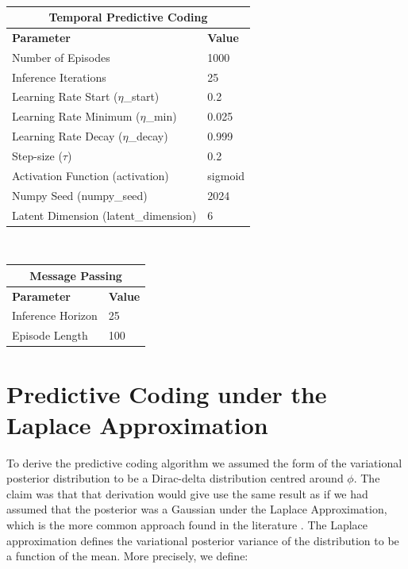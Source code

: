 \documentclass{article}
\begin{document}
\

\begin{table}[h!]
    \centering
    \label{tab:config_table}
    \begin{tabular}{ |p{5cm}||p{5cm}| }
        \hline
        \multicolumn{2}{|c|}{Temporal Predictive Coding} \\
        \hline
        \textbf{Parameter} & \textbf{Value} \\
        \hline
        Number of Episodes & 1000 \\
        Inference Iterations& 25 \\
        Learning Rate Start ($\eta$\_start)  & 0.2 \\
        Learning Rate Minimum ($\eta$\_min)  & 0.025 \\
        Learning Rate Decay ($\eta$\_decay)  & 0.999 \\
        Step-size ($\tau$)  & 0.2 \\
        Activation Function (activation) & sigmoid \\
        Numpy Seed (numpy\_seed)        & 2024 \\
        Latent Dimension (latent\_dimension) & 6 \\
        \hline
    \end{tabular}
\end{table}

\

\begin{table}[h!]
    \centering
    \begin{tabular}{ |p{5cm}||p{5cm}| }
        \hline
        \multicolumn{2}{|c|}{Message Passing} \\
        \hline
        \textbf{Parameter} & \textbf{Value} \\
        \hline
        Inference Horizon & 25 \\
        Episode Length & 100 \\
        \hline
    \end{tabular}
\end{table}

\section{Predictive Coding under the Laplace Approximation}\label{appendix:laplace_approx}

To derive the predictive coding algorithm we assumed the form of the variational posterior distribution to be a Dirac-delta distribution centred around $\phi$. The claim was that that derivation would give use the same result as if we had assumed that the posterior was a Gaussian under the Laplace Approximation, which is the more common approach found in the literature \citet{friston2005theory, buckley2017free}. The Laplace approximation defines the variational posterior variance of the distribution to be a function of the mean. More precisely, we define:
\end{document}
